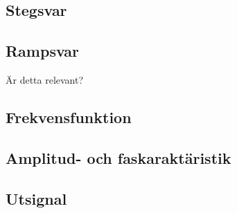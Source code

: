 \subsection{Stegsvar}


\subsection{Rampsvar}
Är detta relevant? 

\subsection{Frekvensfunktion}


\subsection{Amplitud- och faskaraktäristik}


\subsection{Utsignal}
